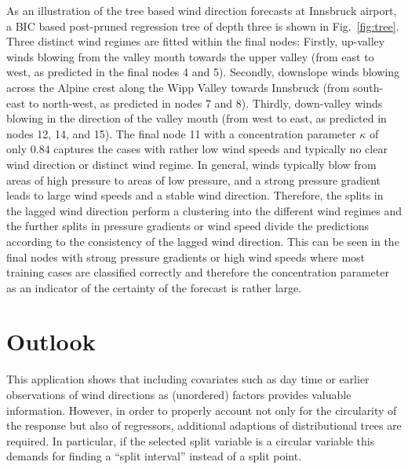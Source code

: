 \documentclass[twoside]{report}
\begin{document}
As an illustration of the tree based wind direction forecasts at Innsbruck airport, a
BIC based post-pruned regression tree of depth three is shown in
Fig.~\ref{fig:tree}. Three distinct wind regimes are fitted within the final
nodes: Firstly, up-valley winds blowing from the valley mouth towards the upper
valley (from east to west, as predicted in the final nodes 4 and 5). Secondly,
downslope winds blowing across the Alpine crest along the Wipp Valley towards
Innsbruck (from south-east to north-west, as predicted in nodes 7 and 8).
Thirdly, down-valley winds blowing in the direction of the valley mouth (from
west to east, as predicted in nodes 12, 14, and 15). The final node 11 with a
concentration parameter $\kappa$ of only $0.84$ captures the cases with rather low
wind speeds and typically no clear wind direction or distinct wind regime.
In general, winds typically blow from areas of high pressure to areas of low
pressure, and a strong pressure gradient leads to large wind speeds and a stable
wind direction. Therefore, the splits in the lagged wind direction perform a
clustering into the different wind regimes and the further splits in pressure
gradients or wind speed divide the predictions according to the consistency of
the lagged wind direction. This can be seen in the final nodes with strong
pressure gradients or high wind speeds where most training cases are classified
correctly and therefore the concentration parameter as an indicator of the
certainty of the forecast is rather large. 

\section{Outlook}

This application shows that including covariates such as day time or earlier observations 
of wind directions as (unordered) factors provides valuable information. However, in order 
to properly account not only for the circularity of the response but also of regressors, 
additional adaptions of distributional trees are required. 
In particular, if the selected split variable is a circular variable this demands for 
finding a ``split interval'' instead of a split point.
\end{document}
